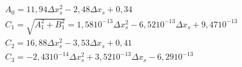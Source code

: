 
\begin{eqnarray}
&A_0=11,94 \Delta x_s^2-2,48\Delta x_s+ 0,34\\
&C_1=\sqrt{A_1^2+B_1^2}=1,58 10^{-13} \Delta x_s^2-6,52 10^{-13} \Delta x_s+ 9,47 10^{-13}\\
&C_2=16,88 \Delta x_s^2-3,53  \Delta x_s+0,41\\
&C_3=-2,43 10^{-14} \Delta x_s^2+3,52 10^{-13} \Delta x_s- 6,29 10^{-13}
\end{eqnarray}































































